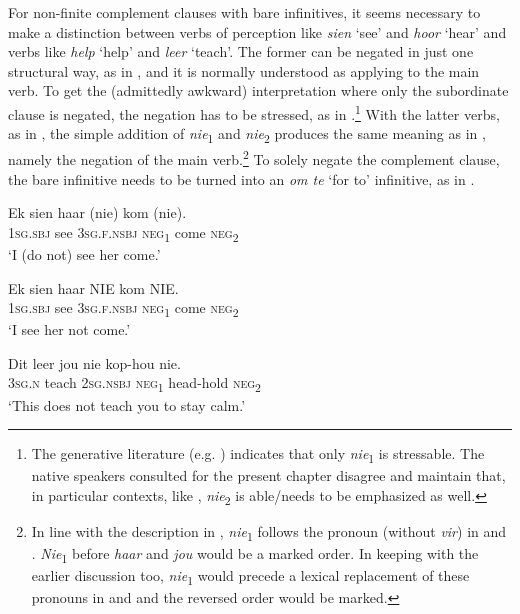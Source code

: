 \documentclass[output=paper,colorlinks,citecolor=brown]{langscibook}
\begin{document}
For non-finite complement clauses with bare infinitives, it seems necessary to make a distinction between verbs of perception like \textit{sien} ‘see’ and \textit{hoor} ‘hear’ and verbs like \textit{help} ‘help’ and \textit{leer} ‘teach’. The former can be negated in just one structural way, as in , and it is normally understood as applying to the main verb. To get the (admittedly awkward) interpretation where only the subordinate clause is negated, the negation has to be stressed, as in .\footnote{The generative literature (e.g. \citealt[4]{BiberauerCyrino2009}) indicates that only \textit{nie}\textsubscript{1} is stressable. The native speakers consulted for the present chapter disagree and maintain that, in particular contexts, like , \textit{nie}\textsubscript{2} is able/needs to be emphasized as well.} With the latter verbs, as in , the simple addition of \textit{nie}\textsubscript{1} and \textit{nie}\textsubscript{2} produces the same meaning as in , namely the negation of the main verb.\footnote{In line with the description in , \textit{nie}\textsubscript{1} follows the pronoun (without \textit{vir}) in  and . \textit{Nie}\textsubscript{1} before \textit{haar} and \textit{jou} would be a marked order. In keeping with the earlier discussion too, \textit{nie}\textsubscript{1} would precede a lexical replacement of these pronouns in  and  and the reversed order would be marked.} To solely negate the complement clause, the bare infinitive needs to be turned into an \textit{om te} ‘for to’ infinitive, as in .

\ea\label{ex:afr:23}
    \ea\label{ex:afr:23a}
        \gll Ek sien haar (nie) kom (nie). \\ 
             \textsc{1sg.sbj} see  \textsc{3sg.f.nsbj} \textsc{neg}\textsubscript{1} come  \textsc{neg}\textsubscript{2} \\
        \glt ‘I (do not) see her come.’
    
    \ex\label{ex:afr:23b}
        \gll Ek sien haar NIE kom NIE. \\
             \textsc{1sg.sbj} see  \textsc{3sg.f.nsbj} \textsc{neg}\textsubscript{1} come  \textsc{neg}\textsubscript{2} \\
        \glt ‘I see her not come.’

    \ex\label{ex:afr:23c}
        \gll Dit leer jou nie kop-hou nie. \\ 
             \textsc{3sg.n} teach  2\textsc{sg.nsbj} \textsc{neg}\textsubscript{1} head-hold  \textsc{neg}\textsubscript{2} \\
        \glt ‘This does not teach you to stay calm.’
    
\end{document}
